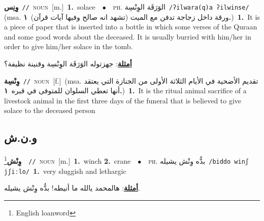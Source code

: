 \documentclass[10pt,a4paper,twoside]{article} %
\begin{document}
\begin{multicols}{2}
{\setlength\topsep{0pt}\textbf{\foreignlanguage{arabic}{وِنِس}}\ {\color{gray}\texttt{//}\color{black}}\ \textsc{noun}\ [m.]\ \textbf{1.}~solace\ \ $\bullet$\ \ \textsc{ph.} \color{gray} \foreignlanguage{arabic}{الوَرَقَة الوِنْسِة}\color{black}\ {\color{gray}\texttt{/{\sffamily ʔilwara(q)a ʔilwinse}/}\color{black}}\ \color{gray} (msa. \foreignlanguage{arabic}{ورقة داخل زجاجة تدفن مع الميت (تشهد انه صالح وفيها آيات قرآن)}~\foreignlanguage{arabic}{\textbf{١.}})\color{black}\ \textbf{1.}~It is a piece of paper that is inserted into a bottle in which some verses of the Quraan and some good words about the deceased. It is usually burried with him/her in order to give him/her solace in the tomb.\  \begin{flushright}\color{gray}\foreignlanguage{arabic}{\textbf{\underline{\foreignlanguage{arabic}{أمثلة}}}: جهزتوله الوَرَقَة الوِنْسِة وقنينة نظيفة؟}\end{flushright}\color{black}} \vspace{2mm}

{\setlength\topsep{0pt}\textbf{\foreignlanguage{arabic}{وِنْسِة}}\ {\color{gray}\texttt{//}\color{black}}\ \textsc{noun}\ [f.]\ \color{gray}(msa. \foreignlanguage{arabic}{تقديم الأضحية في الأيام الثلاثة الأولى من الجنازة التي يعتقد أنها تعطي السلوان للمتوفى في قبره}~\foreignlanguage{arabic}{\textbf{١.}})\color{black}\ \textbf{1.}~It is the ritual animal sacrifice of a livestock animal in the first three days of the funeral that is believed to give solace to the deceased person\ } \vspace{2mm}

\vspace{-3mm}
\subsection*{\color{blue}\foreignlanguage{arabic}{و.ن.ش}\color{blue}{}} 

{\setlength\topsep{0pt}\textbf{\foreignlanguage{arabic}{وِنْش}}\footnote{English loanword}\ \ {\color{gray}\texttt{//}\color{black}}\ \textsc{noun}\ [m.]\ \textbf{1.}~winch  \textbf{2.}~crane\ \ $\bullet$\ \ \textsc{ph.} \color{gray} \foreignlanguage{arabic}{بدُّه وِنْش يشيله}\color{black}\ {\color{gray}\texttt{/{\sffamily biddo winʃ jʃiːlo}/}\color{black}}\ \textbf{1.}~very sluggish and lethargic\  \begin{flushright}\color{gray}\foreignlanguage{arabic}{\textbf{\underline{\foreignlanguage{arabic}{أمثلة}}}: هالمحمد يالله ما أنيطه! بدُّه وِنْش يشيله.}\end{flushright}\color{black}} \vspace{2mm}


\end{multicols}
\end{document}
